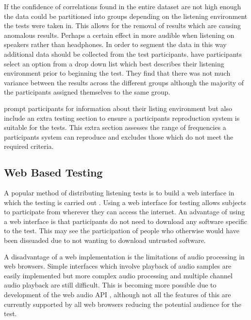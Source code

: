 	If the confidence of correlations found in the entire dataset are not high enough the data could be partitioned into
	groups depending on the listening environment the tests were taken in. This allows for the removal of results which
	are causing anomalous results. Perhaps a certain effect in more audible when listening on speakers rather than
	headphones. In order to segment the data in this way additional data should be collected from the test participants.
	\citet{wilmering2013audio} have participants select an option from a drop down list which best describes their
	listening environment prior to beginning the test. They find that there was not much variance between the results
	across the different groups although the majority of the participants assigned themselves to the same group.

	\citet{seetharaman2014crowdsourcing} prompt participants for information about their listing environment but also
	include an extra testing section to ensure a participants reproduction system is suitable for the tests. This extra
	section assesses the range of frequencies a participants system can reproduce and excludes those which do not meet
	the required criteria.
	
	\subsection{Web Based Testing}
	\label{sec:Timbre-DistributedListeningTests-Web}
		A popular method of distributing listening tests is to build a web interface in which the testing is carried
		out \citep{wilmering2013audio, cartwright2013socialeq, seetharaman2014crowdsourcing}. Using a web interface
		for testing allows subjects to participate from wherever they can access the internet. An advantage of using
		a web interface is that participants do not need to download any software specific to the test. This may see
		the participation of people who otherwise would have been dissuaded due to not wanting to download untrusted
		software.

		A disadvantage of a web implementation is the limitations of audio processing in web browsers. Simple
		interfaces which involve playback of audio samples are easily implemented but more complex audio processing
		and multiple channel audio playback are still difficult. This is becoming more possible due to development
		of the web audio API \citep{adenot2015web}, although not all the features of this are currently supported by
		all web browsers reducing the potential audience for the test.

